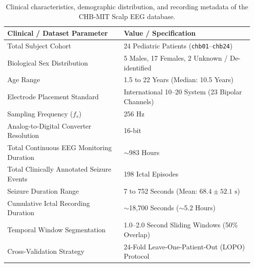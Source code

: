 \documentclass[pdflatex,sn-mathphys-num]{sn-jnl}
\begin{document}
\begin{table}[htbp]
\caption{Clinical characteristics, demographic distribution, and recording metadata of the CHB-MIT Scalp EEG database.}\label{tab1}
\begin{tabular*}{\textwidth}{@{\extracolsep{\fill}}ll@{\extracolsep{\fill}}}
\toprule
Clinical / Dataset Parameter & Value / Specification \\
\midrule
Total Subject Cohort & 24 Pediatric Patients (\texttt{chb01}--\texttt{chb24}) \\
Biological Sex Distribution & 5 Males, 17 Females, 2 Unknown / De-identified \\
Age Range & 1.5 to 22 Years (Median: 10.5 Years) \\
Electrode Placement Standard & International 10--20 System (23 Bipolar Channels) \\
Sampling Frequency ($f_s$) & 256 Hz \\
Analog-to-Digital Converter Resolution & 16-bit \\
Total Continuous EEG Monitoring Duration & $\sim$983 Hours \\
Total Clinically Annotated Seizure Events & 198 Ictal Episodes \\
Seizure Duration Range & 7 to 752 Seconds (Mean: $68.4 \pm 52.1\text{ s}$) \\
Cumulative Ictal Recording Duration & $\sim$18,700 Seconds ($\sim$5.2 Hours) \\
Temporal Window Segmentation & 1.0--2.0 Second Sliding Windows (50\% Overlap) \\
Cross-Validation Strategy & 24-Fold Leave-One-Patient-Out (LOPO) Protocol \\
\bottomrule
\end{tabular*}
\end{table}
\end{document}
